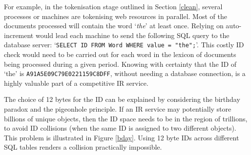 For example, in the tokenisation stage outlined in Section
\ref{clean}, several processes or machines are tokenising web
resources in parallel.  Most of the documents processed will
contain the word `{\it the}' at least once.  Relying on
auto-increment would lead each machine to send the following
SQL query to the database server:
`{\tt SELECT ID FROM Word WHERE value = "the";}'.
This costly ID check would need to be
carried out for each word in the lexicon of documents being
processed during a given period.  Knowing with certainty that
the ID of `the' is {\tt A91A5E09C79E0221159C8DFF}, without
needing a database connection, is a highly valuable part of a
competitive IR service.

The choice of 12 bytes for the ID can be explained by
considering the birthday paradox and the pigeonhole principle.
If an IR service may potentially store billions of unique objects,
then the ID space needs to be in the region of trillions, to avoid
ID collisions (when the same ID is assigned to two
different objects).  This problem is illustrated in Figure \ref{bday}.
Using 12 byte IDs across different SQL tables renders a collision
practically impossible.

